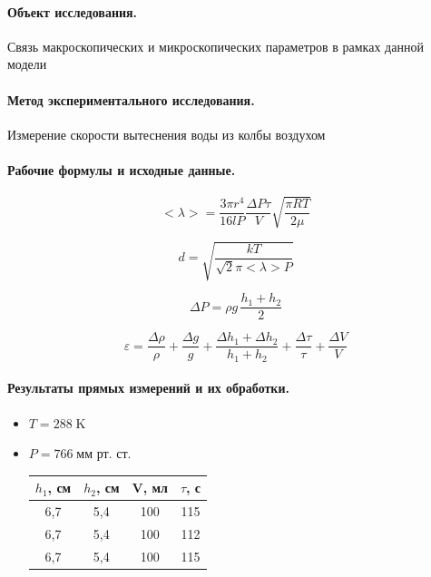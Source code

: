 \documentclass{article}
\begin{document}
	\paragraph{Объект исследования.}
	Связь макроскопических и микроскопических параметров в рамках данной модели
	
	\paragraph{Метод экспериментального исследования.}
	Измерение скорости вытеснения воды из колбы воздухом
	
	\paragraph{Рабочие формулы и исходные данные.}\hypertarget{formuls}{}
	\begin{equation}
		<\lambda>=\frac{3\pi r^4}{16lP} \frac{\Delta P\tau}{V} \sqrt{\frac{\pi RT}{2\mu}}
	\end{equation}
	
	\begin{equation}
		d=\sqrt{\frac{kT}{\sqrt{2}\pi <\lambda>P}}
	\end{equation}
	
	\begin{equation}
		\Delta P=\rho g\, \frac{h_1+h_2}{2}
	\end{equation}
	
	\begin{equation}
		\varepsilon=\frac{\Delta \rho}{\rho}+\frac{\Delta g}{g}+\frac{\Delta h_1+\Delta h_2}{h_1+h_2}+\frac{\Delta \tau}{\tau}+\frac{\Delta V}{V}
	\end{equation}
	
	\paragraph{Результаты прямых измерений и их обработки.}
	\begin{itemize}
		\item $T=288\;\mbox{K}$
		\item$P=766\;\mbox{мм рт. ст.}$
		\begin{table}[htb]
			\begin{tabular}{c|c|c|c}
				$h_1$,  см & $h_2$,  см & V,  мл & $\tau$,  с \\
				\hline
				6,7 & 5,4 & 100 & 115 \\
				
				6,7 & 5,4 & 100 & 112 \\
				
				6,7 & 5,4 & 100 & 115 \\
			\end{tabular}
		\end{table}
	\end{itemize}
	
\end{document}

